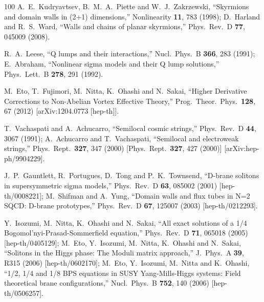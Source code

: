 \documentclass[aps,prd,preprint,
superscriptaddress]{revtex4}
\newcommand {\1}[1]{\frac{1}{#1}}
\newcommand {\2}[1]{\frac{i}{#1}}
\begin{document}
\begin{thebibliography}{100}
  A.~E.~Kudryavtsev, B.~M.~A.~Piette and W.~J.~Zakrzewski,
  ``Skyrmions and domain walls in (2+1) dimensions,''
  Nonlinearity {\bf 11}, 783 (1998);
  D.~Harland and R.~S.~Ward,
  ``Walls and chains of planar skyrmions,''
  Phys.\ Rev.\  D {\bf 77}, 045009 (2008).

  R.~A.~Leese,
  ``Q lumps and their interactions,''  Nucl.\ Phys.\ B {\bf 366}, 283 (1991);  %
  E.~Abraham,
  ``Nonlinear sigma models and their Q lump solutions,''  Phys.\ Lett.\ B {\bf 278}, 291 (1992).  %

  M.~Eto, T.~Fujimori, M.~Nitta, K.~Ohashi and N.~Sakai,
  ``Higher Derivative Corrections to Non-Abelian Vortex Effective Theory,''  Prog.\ Theor.\ Phys.\  {\bf 128}, 67 (2012)  [arXiv:1204.0773 [hep-th]].  %

  T.~Vachaspati and A.~Achucarro,
  ``Semilocal cosmic strings,''
  Phys.\ Rev.\  D {\bf 44}, 3067 (1991);
  A.~Achucarro and T.~Vachaspati,
  ``Semilocal and electroweak strings,''
  Phys.\ Rept.\  {\bf 327}, 347 (2000)
  [Phys.\ Rept.\  {\bf 327}, 427 (2000)]
  [arXiv:hep-ph/9904229].

  J.~P.~Gauntlett, R.~Portugues, D.~Tong and P.~K.~Townsend,
  ``D-brane solitons in supersymmetric sigma models,''  
Phys.\ Rev.\ D {\bf 63}, 085002 (2001) 
  [hep-th/0008221];  %
  M.~Shifman and A.~Yung,
  ``Domain walls and flux tubes in N=2 SQCD: D-brane prototypes,''  
Phys.\ Rev.\ D {\bf 67}, 125007 (2003)  [hep-th/0212293].  %

  Y.~Isozumi, M.~Nitta, K.~Ohashi and N.~Sakai,
  ``All exact solutions of a 1/4 Bogomol'nyi-Prasad-Sommerfield equation,''
  Phys.\ Rev.\ D {\bf 71}, 065018 (2005)
  [hep-th/0405129];
  M.~Eto, Y.~Isozumi, M.~Nitta, K.~Ohashi and N.~Sakai,
  ``Solitons in the Higgs phase: The Moduli matrix approach,''  J.\ Phys.\ A {\bf 39}, R315 (2006)  [hep-th/0602170];  %
  M.~Eto, Y.~Isozumi, M.~Nitta and K.~Ohashi,
  ``1/2, 1/4 and 1/8 BPS equations in SUSY Yang-Mills-Higgs systems: Field theoretical brane configurations,''  Nucl.\ Phys.\ B {\bf 752}, 140 (2006)  [hep-th/0506257].  %


\end{thebibliography}
\end{document}
